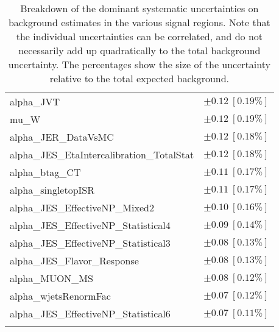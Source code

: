 \begin{table}
\begin{center}
\begin{tabular*}{\textwidth}{@{\extracolsep{\fill}}lc}
alpha\_JVT         & $\pm 0.12\ [0.19\%] $       \\
mu\_W         & $\pm 0.12\ [0.19\%] $       \\
alpha\_JER\_DataVsMC         & $\pm 0.12\ [0.18\%] $       \\
alpha\_JES\_EtaIntercalibration\_TotalStat         & $\pm 0.12\ [0.18\%] $       \\
alpha\_btag\_CT         & $\pm 0.11\ [0.17\%] $       \\
alpha\_singletopISR         & $\pm 0.11\ [0.17\%] $       \\
alpha\_JES\_EffectiveNP\_Mixed2         & $\pm 0.10\ [0.16\%] $       \\
alpha\_JES\_EffectiveNP\_Statistical4         & $\pm 0.09\ [0.14\%] $       \\
alpha\_JES\_EffectiveNP\_Statistical3         & $\pm 0.08\ [0.13\%] $       \\
alpha\_JES\_Flavor\_Response         & $\pm 0.08\ [0.13\%] $       \\
alpha\_MUON\_MS         & $\pm 0.08\ [0.12\%] $       \\
alpha\_wjetsRenormFac         & $\pm 0.07\ [0.12\%] $       \\
alpha\_JES\_EffectiveNP\_Statistical6         & $\pm 0.07\ [0.11\%] $       \\
\noalign{\smallskip}\hline\noalign{\smallskip}
\end{tabular*}
\end{center}
\caption[Breakdown of uncertainty on background estimates]{
Breakdown of the dominant systematic uncertainties on background estimates in the various signal regions.
Note that the individual uncertainties can be correlated, and do not necessarily add up quadratically to 
the total background uncertainty. The percentages show the size of the uncertainty relative to the total expected background.
\label{table.results.bkgestimate.uncertainties.VRtt2onEM_cuts}}
\end{table}
%